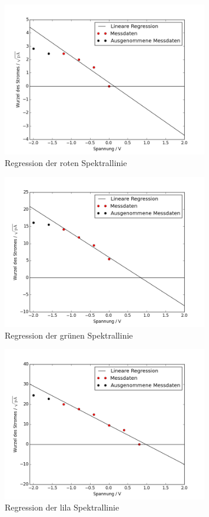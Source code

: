 \begin{figure}[h!]
	\centering
	\includegraphics[width=0.8\textwidth]{build/regression_Farbe:0.png}
	\caption{Regression der roten Spektrallinie}
	\label{fig:regression_rot}
\end{figure}

\begin{figure}[h!]
	\centering
	\includegraphics[width=0.8\textwidth]{build/regression_Farbe:1.png}
	\caption{Regression der grünen Spektrallinie}
	\label{fig:regression_grun}
\end{figure}

\begin{figure}[h!]
	\centering
	\includegraphics[width=0.8\textwidth]{build/regression_Farbe:2.png}
	\caption{Regression der lila Spektrallinie}
	\label{fig:regression_lila}
\end{figure}


